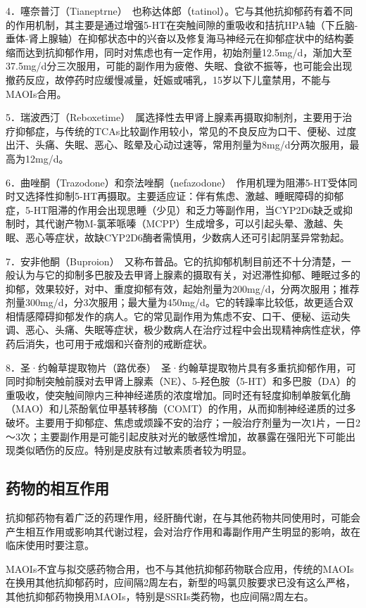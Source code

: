4．噻奈普汀（Tianeptrne）　也称达体郎（tatinol）。它与其他抗抑郁药有着不同的作用机制，其主要是通过增强5-HT在突触间隙的重吸收和拮抗HPA轴（下丘脑-垂体-肾上腺轴）在抑郁状态中的兴奋以及修复海马神经元在抑郁症状中的结构萎缩而达到抗抑郁作用，同时对焦虑也有一定作用，初始剂量12.5mg/d，渐加大至37.5mg/d分三次服用，可能的副作用为疲倦、失眠、食欲不振等，也可能会出现撤药反应，故停药时应缓慢减量，妊娠或哺乳，15岁以下儿童禁用，不能与MAOIs合用。

5．瑞波西汀（Reboxetime）　属选择性去甲肾上腺素再摄取抑制剂，主要用于治疗抑郁症，与传统的TCAs比较副作用较小，常见的不良反应为口干、便秘、过度出汗、头痛、失眠、恶心、眩晕及心动过速等，常用剂量为8mg/d分两次服用，最高为12mg/d。

6．曲唑酮（Trazodone）和奈法唑酮（nefazodone）　作用机理为阻滞5-HT受体同时又选择性抑制5-HT再摄取。主要适应证：伴有焦虑、激越、睡眠障碍的抑郁症，5-HT阻滞的作用会出现思睡（少见）和乏力等副作用，当CYP2D6缺乏或抑制时，其代谢产物M-氯苯哌嗪（MCPP）生成增多，可以引起头晕、激越、失眠、恶心等症状，故缺CYP2D6酶者需慎用，少数病人还可引起阴茎异常勃起。

7．安非他酮（Buproion）　又称布普品。它的抗抑郁机制目前还不十分清楚，一般认为与它的抑制多巴胺及去甲肾上腺素的摄取有关，对迟滞性抑郁、睡眠过多的抑郁，效果较好，对中、重度抑郁有效，起始剂量为200mg/d，分两次服用；推荐剂量300mg/d，分3次服用；最大量为450mg/d。它的转躁率比较低，故更适合双相情感障碍抑郁发作的病人。它的常见副作用为焦虑不安、口干、便秘、运动失调、恶心、头痛、失眠等症状，极少数病人在治疗过程中会出现精神病性症状，停药后消失，也可用于戒烟和兴奋剂的戒断症状。

8．圣·约翰草提取物片（路优泰）　圣·约翰草提取物片具有多重抗抑郁作用，可同时抑制突触前膜对去甲肾上腺素（NE）、5-羟色胺（5-HT）和多巴胺（DA）的重吸收，使突触间隙内三种神经递质的浓度增加。同时还有轻度抑制单胺氧化酶（MAO）和儿茶酚氧位甲基转移酶（COMT）的作用，从而抑制神经递质的过多破坏。主要用于抑郁症、焦虑或烦躁不安的治疗；一般治疗剂量为一次1片，一日2～3次；主要副作用是可能引起皮肤对光的敏感性增加，故暴露在强阳光下可能出现类似晒伤的反应。特别是皮肤有过敏素质者较为明显。

\subsection{药物的相互作用}

抗抑郁药物有着广泛的药理作用，经肝酶代谢，在与其他药物共同使用时，可能会产生相互作用或影响其代谢过程，会对治疗作用和毒副作用产生明显的影响，故在临床使用时要注意。

MAOIs不宜与拟交感药物合用，也不与其他抗抑郁药物联合应用，传统的MAOIs在换用其他抗抑郁药时，应间隔2周左右，新型的吗氯贝胺要求已没有这么严格，其他抗抑郁药物换用MAOIs，特别是SSRIs类药物，也应间隔2周左右。

